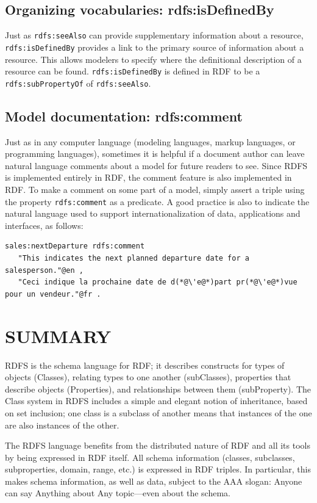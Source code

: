 \subsection{Organizing vocabularies: rdfs:isDefinedBy}

Just as \texttt{rdfs:seeAlso} can provide supplementary information about a
resource, \texttt{rdfs:isDefinedBy} provides a link to the primary source of
information about a resource. This allows modelers to specify where the
definitional description of a resource can be found. \texttt{rdfs:isDefinedBy} is
defined in RDF to be a \texttt{rdfs:subPropertyOf} of \texttt{rdfs:seeAlso}.

\subsection{Model documentation: rdfs:comment}

Just as in any computer language (modeling languages, markup languages,
or programming languages), sometimes it is helpful if a document author
can leave natural language comments about a model for future readers to
see. Since RDFS is implemented entirely in RDF, the comment feature is
also implemented in RDF. To make a comment on some part of a model,
simply assert a triple using the property \texttt{rdfs:comment} as a predicate.
A good practice is also to indicate the natural language used to support 
internationalization of data, applications and interfaces, as follows:

\begin{lstlisting}
sales:nextDeparture rdfs:comment
   "This indicates the next planned departure date for a salesperson."@en ,
   "Ceci indique la prochaine date de d(*@\'e@*)part pr(*@\'e@*)vue pour un vendeur."@fr .
\end{lstlisting}

\section{SUMMARY}

RDFS is the schema language for RDF; it describes constructs for types
of objects (Classes), relating types to one another (subClasses),
properties that describe objects (Properties), and relationships between
them (subProperty). The Class system in RDFS includes a simple and
elegant notion of inheritance, based on set inclusion; one class is a
subclass of another means that instances of the one are also instances
of the other.

The RDFS language benefits from the distributed nature of RDF and all
its tools by being expressed in RDF itself. All schema information
(classes, subclasses, subproperties, domain, range, etc.) is expressed
in RDF triples. In particular, this makes schema information, as well as
data, subject to the AAA slogan: Anyone can say Anything about Any
topic---even about the schema.

